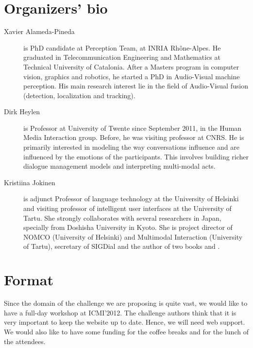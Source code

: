 \documentclass{sig-alternate}
\begin{document}
\section{Organizers' bio}
\begin{description}
 \item [Xavier Alameda-Pineda] is PhD candidate at Perception Team, at INRIA Rh\^one-Alpes. He graduated in
Telecommunication Engineering and Mathematics at Technical University of Catalonia. After a Masters program in computer
vision, graphics and robotics, he started a PhD in Audio-Visual machine perception. His main research interest lie in
the field of Audio-Visual fusion (detection, localization and tracking).
 \item [Dirk Heylen] is Professor at University of Twente since September 2011, in the Human Media Interaction group.
Before, he was visiting professor at CNRS. He is primarily interested in modeling the way conversations influence and
are influenced by the emotions of the participants. This involves building richer dialogue management models and
interpreting multi-modal acts.
 \item [Kristiina Jokinen] is adjunct Professor of language technology at the University of Helsinki and visiting
professor of intelligent user interfaces at the University of Tartu. She strongly collaborates with
several researchers in Japan, specially from Doshisha University in Kyoto. She is project director of NOMCO
(University of Helsinki) and Multimodal Interaction (University of Tartu), secretary of SIGDial and the author of two
books \cite{Jokinen09} and \cite{Jokinen09a}.	
\end{description}

\section{Format}
Since the domain of the challenge we are proposing is quite vast, we would like to have a full-day workshop at
ICMI'2012. The challenge authors think that it is very important to keep the website up to date. Hence, we will need
web support. We would also like to have some funding for the coffee breaks and for the lunch of the attendees.



\end{document}
